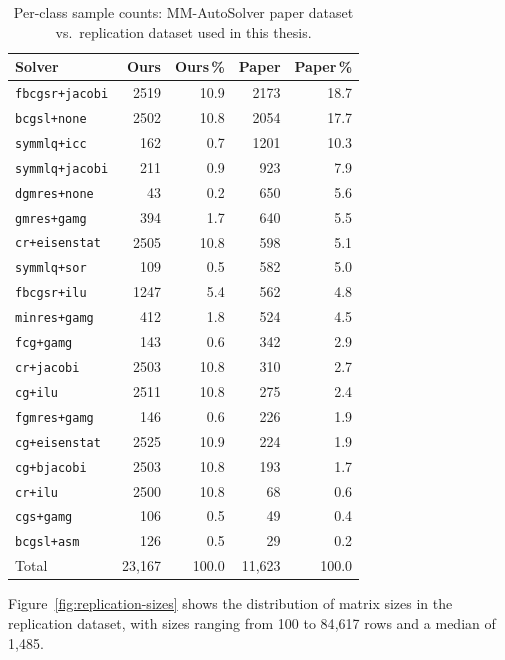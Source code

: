 \begin{table}[H]
  \centering
  \caption{Per-class sample counts: MM-AutoSolver paper dataset vs.\ replication dataset used in this thesis.}
  \label{tab:replication-distribution}
  \begin{tabular}{lrrrr}
    \toprule
    \textbf{Solver} & \textbf{Ours} & \textbf{Ours\,\%} & \textbf{Paper} & \textbf{Paper\,\%} \\
    \midrule
    \texttt{fbcgsr+jacobi} & 2519 & 10.9 & 2173 & 18.7 \\
    \texttt{bcgsl+none}    & 2502 & 10.8 & 2054 & 17.7 \\
    \texttt{symmlq+icc}    &  162 &  0.7 & 1201 & 10.3 \\
    \texttt{symmlq+jacobi} &  211 &  0.9 &  923 &  7.9 \\
    \texttt{dgmres+none}   &   43 &  0.2 &  650 &  5.6 \\
    \texttt{gmres+gamg}    &  394 &  1.7 &  640 &  5.5 \\
    \texttt{cr+eisenstat}  & 2505 & 10.8 &  598 &  5.1 \\
    \texttt{symmlq+sor}    &  109 &  0.5 &  582 &  5.0 \\
    \texttt{fbcgsr+ilu}    & 1247 &  5.4 &  562 &  4.8 \\
    \texttt{minres+gamg}   &  412 &  1.8 &  524 &  4.5 \\
    \texttt{fcg+gamg}      &  143 &  0.6 &  342 &  2.9 \\
    \texttt{cr+jacobi}     & 2503 & 10.8 &  310 &  2.7 \\
    \texttt{cg+ilu}        & 2511 & 10.8 &  275 &  2.4 \\
    \texttt{fgmres+gamg}   &  146 &  0.6 &  226 &  1.9 \\
    \texttt{cg+eisenstat}  & 2525 & 10.9 &  224 &  1.9 \\
    \texttt{cg+bjacobi}    & 2503 & 10.8 &  193 &  1.7 \\
    \texttt{cr+ilu}        & 2500 & 10.8 &   68 &  0.6 \\
    \texttt{cgs+gamg}      &  106 &  0.5 &   49 &  0.4 \\
    \texttt{bcgsl+asm}     &  126 &  0.5 &   29 &  0.2 \\
    \midrule
    Total                  & 23{,}167 & 100.0 & 11{,}623 & 100.0 \\
    \bottomrule
  \end{tabular}
\end{table}

Figure~\ref{fig:replication-sizes} shows the distribution of matrix sizes in the replication dataset,
with sizes ranging from 100 to 84{,}617 rows and a median of 1{,}485.

